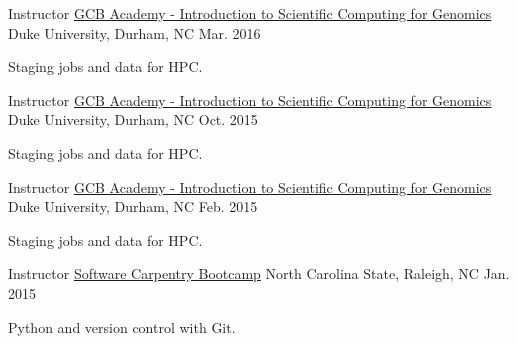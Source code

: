 

\begin{cventries}

  \cventry
    {Instructor} %
    {\href{http://duke-gcb.github.io/SciComp-Mar-2016/}{GCB Academy - Introduction to Scientific Computing for Genomics}} %
    {Duke University, Durham, NC} %
    {Mar. 2016} %
    {
      \begin{cvitems} %
        \item {Staging jobs and data for HPC.}
      \end{cvitems}
    }

  \cventry
    {Instructor} %
    {\href{http://duke-gcb.github.io/SciComp-Oct-2015/}{GCB Academy - Introduction to Scientific Computing for Genomics}} %
    {Duke University, Durham, NC} %
    {Oct. 2015} %
    {
      \begin{cvitems} %
        \item {Staging jobs and data for HPC.}
      \end{cvitems}
    }

  \cventry
    {Instructor} %
    {\href{http://duke-gcb.github.io/SciComp-Feb-2015/}{GCB Academy - Introduction to Scientific Computing for Genomics}} %
    {Duke University, Durham, NC} %
    {Feb. 2015} %
    {
      \begin{cvitems} %
        \item {Staging jobs and data for HPC.}
      \end{cvitems}
    }

  \cventry
    {Instructor} %
    {\href{http://kcranston.github.io/2015-01-29-ncsu/}{Software Carpentry Bootcamp}} %
    {North Carolina State, Raleigh, NC} %
    {Jan. 2015} %
    {
      \begin{cvitems} %
        \item {Python and version control with Git.}
      \end{cvitems}
    }


\end{cventries}
